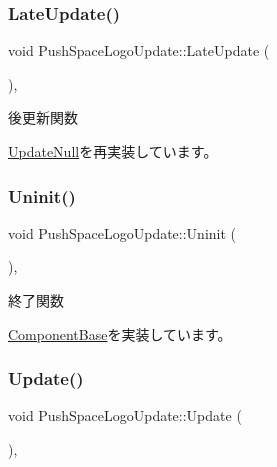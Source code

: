 \subsubsection{\texorpdfstring{Late\+Update()}{LateUpdate()}}
{\footnotesize\ttfamily void Push\+Space\+Logo\+Update\+::\+Late\+Update (\begin{DoxyParamCaption}{ }\end{DoxyParamCaption})\hspace{0.3cm}{\ttfamily [override]}, {\ttfamily [virtual]}}



後更新関数 



\mbox{\hyperlink{class_update_null_ac68da1ba7f3fbcae833442bb1c169200}{Update\+Null}}を再実装しています。

\mbox{\label{class_push_space_logo_update_a94f791874cb6160cd33cd7068fcde0d0}} 
\subsubsection{\texorpdfstring{Uninit()}{Uninit()}}
{\footnotesize\ttfamily void Push\+Space\+Logo\+Update\+::\+Uninit (\begin{DoxyParamCaption}{ }\end{DoxyParamCaption})\hspace{0.3cm}{\ttfamily [override]}, {\ttfamily [virtual]}}



終了関数 



\mbox{\hyperlink{class_component_base_a9f42beaf0383d6f629819579cab4de57}{Component\+Base}}を実装しています。

\mbox{\label{class_push_space_logo_update_aa07fe6f6f4f072e1f81bc6708dd4727e}} 
\subsubsection{\texorpdfstring{Update()}{Update()}}
{\footnotesize\ttfamily void Push\+Space\+Logo\+Update\+::\+Update (\begin{DoxyParamCaption}{ }\end{DoxyParamCaption})\hspace{0.3cm}{\ttfamily [override]}, {\ttfamily [virtual]}}



